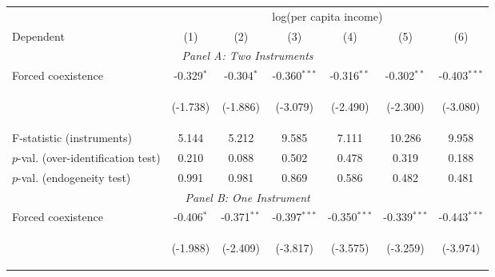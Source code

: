 \begin{center}
\begin{tabular}{lcccccc}
\hline\hline \noalign{\smallskip} & \multicolumn{6}{c}{log(per capita income)}\\
Dependent & (1) & (2) & (3) & (4) & (5) & (6)\\
\hline \multicolumn{7}{c}{\textit{Panel A: Two Instruments}}\\
\noalign{\smallskip}\noalign{\smallskip}Forced coexistence & -0.329$ ^*$ & -0.304$ ^*$ & -0.360$ ^{***}$ & -0.316$ ^{**}$ & -0.302$ ^{**}$ & -0.403$ ^{***}$\\
 & \begin{footnotesize}(-1.738)\end{footnotesize} & \begin{footnotesize}(-1.886)\end{footnotesize} & \begin{footnotesize}(-3.079)\end{footnotesize} & \begin{footnotesize}(-2.490)\end{footnotesize} & \begin{footnotesize}(-2.300)\end{footnotesize} & \begin{footnotesize}(-3.080)\end{footnotesize}\\
\noalign{\smallskip}F-statistic (instruments) & 5.144 & 5.212 & 9.585 & 7.111 & 10.286 & 9.958\\
\noalign{\smallskip}$ p$-val. (over-identification test) & 0.210 & 0.088 & 0.502 & 0.478 & 0.319 & 0.188\\
\noalign{\smallskip}$ p$-val. (endogeneity test) & 0.991 & 0.981 & 0.869 & 0.586 & 0.482 & 0.481\\
\multicolumn{7}{c}{\textit{Panel B: One Instrument}}\\
\noalign{\smallskip}Forced coexistence & -0.406$ ^*$ & -0.371$ ^{**}$ & -0.397$ ^{***}$ & -0.350$ ^{***}$ & -0.339$ ^{***}$ & -0.443$ ^{***}$\\
 & \begin{footnotesize}(-1.988)\end{footnotesize} & \begin{footnotesize}(-2.409)\end{footnotesize} & \begin{footnotesize}(-3.817)\end{footnotesize} & \begin{footnotesize}(-3.575)\end{footnotesize} & \begin{footnotesize}(-3.259)\end{footnotesize} & \begin{footnotesize}(-3.974)\end{footnotesize}\\

\end{tabular}
\end{center}

